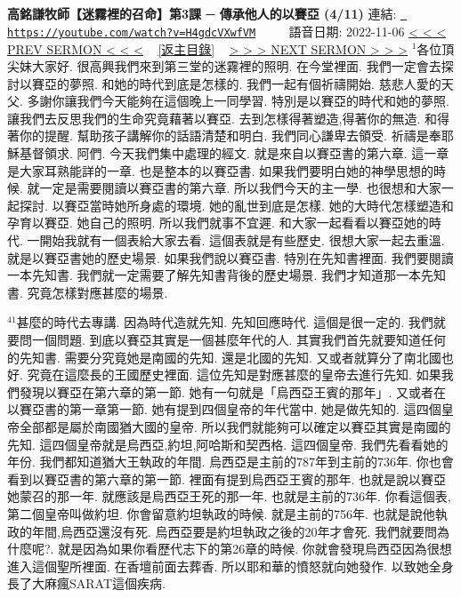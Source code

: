 \documentclass{book}
\begin{document}
\section{}
\label{sec:H4gdcVXwfVM}
\textbf{高銘謙牧師【迷霧裡的召命】第3課 ─ 傳承他人的以賽亞 (4/11)}
\newline
\newline
連結: \href{https://youtube.com/watch?v=H4gdcVXwfVM}{\texttt{ https://youtube.com/watch?v=H4gdcVXwfVM}} ~~~~ 語音日期: 2022-11-06 
\newline
\newline
\hyperref[sec:djNxJ0pc_CU]{\small{< < < PREV SERMON < < <}}
~
\hyperref[sec:index]{\small{[返主目錄]}}
~
\hyperref[sec:gfNxrOBd_U0]{\small{> > > NEXT SERMON > > >}}
\newline
\newline
$^{1}$各位頂尖妹大家好.
很高興我們來到第三堂的迷霧裡的照明.
在今堂裡面.
我們一定會去探討以賽亞的夢照.
和她的時代到底是怎樣的.
我們一起有個祈禱開始.
慈悲人愛的天父.
多謝你讓我們今天能夠在這個晚上一同學習.
特別是以賽亞的時代和她的夢照.
讓我們去反思我們的生命究竟藉著以賽亞.
去到怎樣得著塑造,得著你的無造.
和得著你的提醒.
幫助孩子講解你的話語清楚和明白.
我們同心謙卑去領受.
祈禱是奉耶穌基督領求.
阿們.
今天我們集中處理的經文.
就是來自以賽亞書的第六章.
這一章是大家耳熟能詳的一章.
也是整本的以賽亞書.
如果我們要明白她的神學思想的時候.
就一定是需要閱讀以賽亞書的第六章.
所以我們今天的主一學.
也很想和大家一起探討.
以賽亞當時她所身處的環境.
她的亂世到底是怎樣.
她的大時代怎樣塑造和孕育以賽亞.
她自己的照明.
所以我們就事不宜遲.
和大家一起看看以賽亞她的時代.
一開始我就有一個表給大家去看.
這個表就是有些歷史.
很想大家一起去重溫.
就是以賽亞書她的歷史場景.
如果我們說以賽亞書.
特別在先知書裡面.
我們要閱讀一本先知書.
我們就一定需要了解先知書背後的歷史場景.
我們才知道那一本先知書.
究竟怎樣對應甚麼的場景.

$^{41}$甚麼的時代去專講.
因為時代造就先知.
先知回應時代.
這個是很一定的.
我們就要問一個問題.
到底以賽亞其實是一個甚麼年代的人.
其實我們首先就要知道任何的先知書.
需要分究竟她是南國的先知.
還是北國的先知.
又或者就算分了南北國也好.
究竟在這麼長的王國歷史裡面.
這位先知是對應甚麼的皇帝去進行先知.
如果我們發現以賽亞在第六章的第一節.
她有一句就是「烏西亞王賓的那年」.
又或者在以賽亞書的第一章第一節.
她有提到四個皇帝的年代當中.
她是做先知的.
這四個皇帝全部都是屬於南國猶大國的皇帝.
所以我們就能夠可以確定以賽亞其實是南國的先知.
這四個皇帝就是烏西亞,約坦,阿哈斯和契西格.
這四個皇帝.
我們先看看她的年份.
我們都知道猶大王執政的年間.
烏西亞是主前的787年到主前的736年.
你也會看到以賽亞書的第六章的第一節.
裡面有提到烏西亞王賓的那年.
也就是說以賽亞她蒙召的那一年.
就應該是烏西亞王死的那一年.
也就是主前的736年.
你看這個表,第二個皇帝叫做約坦.
你會留意約坦執政的時候.
就是主前的756年.
也就是說他執政的年間,烏西亞還沒有死.
烏西亞要是約坦執政之後的20年才會死.
我們就要問為什麼呢?.
就是因為如果你看歷代志下的第26章的時候.
你就會發現烏西亞因為很想進入這個聖所裡面.
在香壇前面去葬香.
所以耶和華的憤怒就向她發作.
以致她全身長了大麻瘋SARAT這個疾病.
\end{document}

